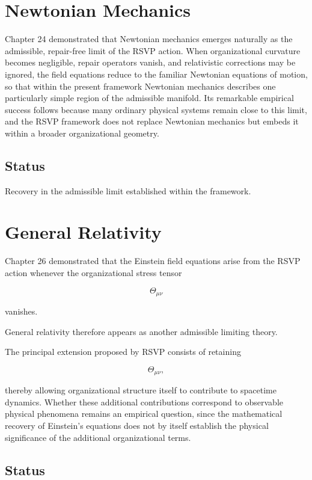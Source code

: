\documentclass[11pt,oneside]{book}
\numberwithin{equation}{chapter}
\theoremstyle{definition}
\theoremstyle{plain}
\begin{document}
\section{Newtonian Mechanics}

Chapter 24 demonstrated that Newtonian mechanics emerges naturally as the admissible, repair-free limit of the RSVP action. When organizational curvature becomes negligible, repair operators vanish, and relativistic corrections may be ignored, the field equations reduce to the familiar Newtonian equations of motion, so that within the present framework Newtonian mechanics describes one particularly simple region of the admissible manifold. Its remarkable empirical success follows because many ordinary physical systems remain close to this limit, and the RSVP framework does not replace Newtonian mechanics but embeds it within a broader organizational geometry.

\subsection*{Status}

Recovery in the admissible limit established within the framework.

\section{General Relativity}

Chapter 26 demonstrated that the Einstein field equations arise from the
RSVP action whenever the organizational stress tensor

\[
\Theta_{\mu\nu}
\]

vanishes.

General relativity therefore appears as another admissible limiting theory.

The principal extension proposed by RSVP consists of retaining

\[
\Theta_{\mu\nu},
\]

thereby allowing organizational structure itself to contribute to spacetime dynamics. Whether these additional contributions correspond to observable physical phenomena remains an empirical question, since the mathematical recovery of Einstein's equations does not by itself establish the physical significance of the additional organizational terms.

\subsection*{Status}
\end{document}
